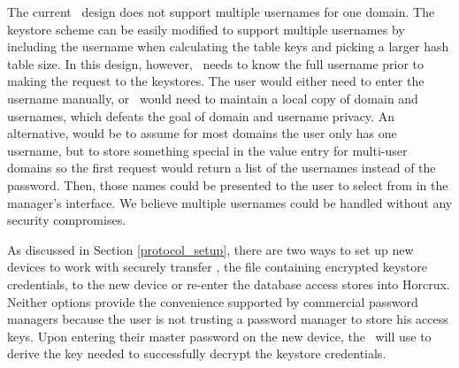 

The current \SecPass\ design does not support multiple usernames for one domain. The keystore scheme can be easily modified to support multiple usernames by including the username when calculating the table keys and picking a larger hash table size. In this design, however, \SecPass\ needs to know the full username prior to making the request to the keystores. The user would either need to enter the username manually, or \SecPass\ would need to maintain a local copy of domain and usernames, which defeats the goal of domain and username privacy.  An alternative, would be to assume for most domains the user only has one username, but to store something special in the value entry for multi-user domains so the first request would return a list of the usernames instead of the password. Then, those names could be presented to the user to select from in the manager's interface. We believe multiple usernames could be handled without any security compromises.

As discussed in Section \ref{protocol_setup}, there are two ways to set up new devices to work with \SecPass\: securely transfer , the file containing encrypted keystore credentials, to the new device or re-enter the database access stores into Horcrux. Neither options provide the convenience supported by commercial password managers because the user is not trusting a password manager to store his access keys. 
Upon entering their master password on the new device, the \Core\ will use  to derive the key needed to successfully decrypt the keystore credentials.


